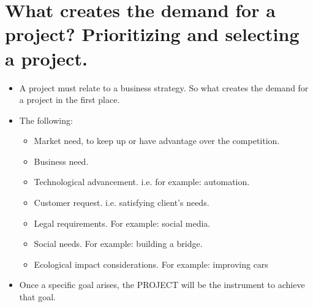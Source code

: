 \section{What creates the demand for a project? Prioritizing and selecting a project.}
\begin{itemize}
    \item A project must relate to a business strategy. So what creates the demand for a project in the first place.
    \item The following:
        \begin{itemize}
            \item Market need, to keep up or have advantage over the competition.
            \item Business need.
            \item Technological advancement. i.e. for example: automation.
            \item Customer request. i.e. satisfying client's needs.
            \item Legal requirements. For example: social media.
            \item Social needs. For example: building a bridge.
            \item Ecological impact considerations. For example: improving cars 
        \end{itemize}
    
    \item Once a specific goal arises, the PROJECT will be the instrument to achieve that goal.
\end{itemize}


